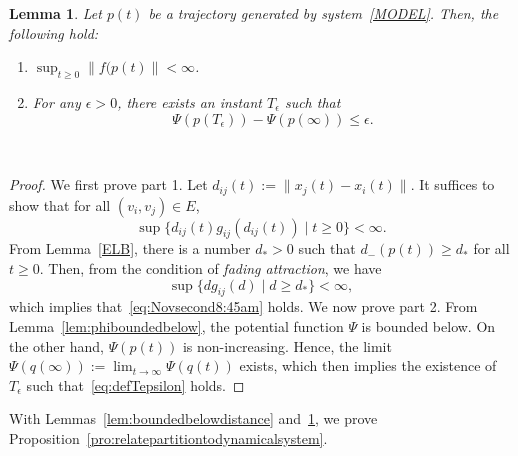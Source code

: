 \documentclass[10pt,twocolumn,twoside]{IEEEtran}
\newtheorem{lem}{Lemma}
\renewcommand{\(}{\left (}
\renewcommand{\)}{\right )}
\renewcommand{\;}{\,;\,}
\begin{document}
\begin{lem}\label{lem:upperboundonvelocity}
Let $p(t)$ be a trajectory generated by system~\eqref{MODEL}. Then, the following hold:
\begin{enumerate}
\item $\sup_{t \ge 0} \|f(p(t)\|  < \infty$.
\item For any $\epsilon > 0 $, there exists an instant $T_{\epsilon}$ such that 
\begin{equation}\label{eq:defTepsilon}
\Psi\(p(T_{\epsilon})\) - \Psi\(p(\infty)\) \le \epsilon.
\end{equation}
\end{enumerate}\,
\end{lem}


\begin{proof} We first prove part 1. 
Let $d_{ij}(t):= \|x_j(t) -x_i(t)\|$. It suffices to show that for all $(v_i,v_j) \in E$,  
\begin{equation}\label{eq:Novsecond8:45am}
\sup \{d_{ij}(t)g_{ij}(d_{ij}(t)) \mid t \ge 0   \} < \infty.
\end{equation}
From Lemma~\ref{ELB}, there is a number $d_*> 0$ such that $d_-(p(t)) \ge d_*$ for all $t \ge 0$. 
Then, from the condition of {\it fading attraction}, we have
$$
\sup\{dg_{ij}(d) \mid d \ge d_*\} < \infty,
$$
which implies that~\eqref{eq:Novsecond8:45am} holds. 
We now prove part 2. From Lemma~\ref{lem:phiboundedbelow}, the potential function $\Psi$ is bounded below. On the other hand, $\Psi(p(t))$ is non-increasing. Hence,   
the limit
$
\Psi(q(\infty)) := \lim_{t \to \infty}\Psi(q(t)) 
$   
exists, which then implies the existence of $T_{\epsilon}$ such that~\eqref{eq:defTepsilon} holds.   
\end{proof}

With Lemmas~\ref{lem:boundedbelowdistance} and~\ref{lem:upperboundonvelocity}, we prove Proposition~\ref{pro:relatepartitiontodynamicalsystem}.
\end{document}
